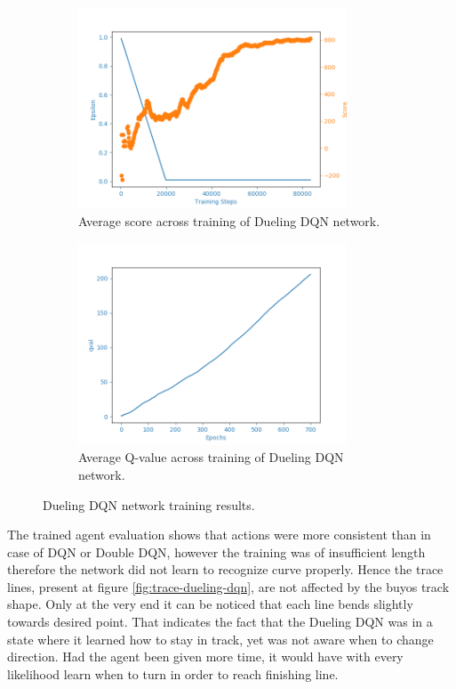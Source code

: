 \begin{figure}[h]
\begin{subfigure}{.48\textwidth}
    \centering
    \includegraphics[width=8cm]{img/DuelingDQNAgent_WamvNavTwoSetsBuoys-v0_normal_1128_1318.png}
    \caption{Average score across training of Dueling DQN network.}
    \label{fig:avg-score-dueling-dqn}
\end{subfigure}
\begin{subfigure}{.48\textwidth}
    \centering
    \includegraphics[width=8cm]{img/DuelingDQNAgent_WamvNavTwoSetsBuoys-v0_normal_1128_1318_qval.png}
    \caption{Average Q-value across training of Dueling DQN network.}
    \label{fig:avg-qval-dueling-dqn}
\end{subfigure}
\caption{Dueling DQN network training results.}
\label{fig:results-dueling-dqn}
\end{figure}

The trained agent evaluation shows that actions were more consistent than in case of DQN or Double DQN, however the training was
of insufficient length therefore the network did not learn to recognize curve properly. Hence the trace lines, present at figure \ref{fig:trace-dueling-dqn}, are not affected by the buyos track shape. Only at the very end it can be noticed that each line bends
slightly towards desired point. That indicates the fact that the Dueling DQN was in a state where it learned how to stay in track,
yet was not aware when to change direction. Had the agent been given more time, it would have with every likelihood learn when to turn
in order to reach finishing line.


